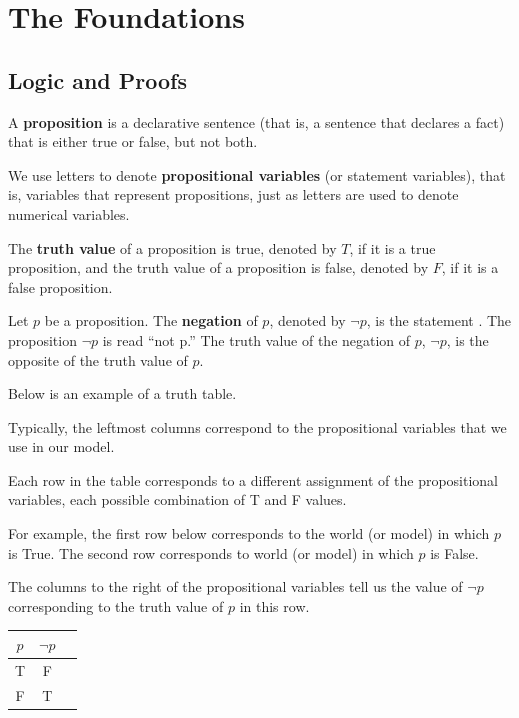 \section{The Foundations}
\subsection{Logic and Proofs}

\begin{defn}[proposition]
A \textbf{proposition} is a declarative sentence (that is, a sentence that declares a fact) that is either true
or false, but not both.
\end{defn}

\begin{defn}
We use letters to denote \textbf{propositional variables} (or statement variables), that is, variables that represent propositions, just as letters are used to denote numerical variables.
\end{defn}
\begin{defn} The \textbf{truth value} of a proposition is true, denoted by $T$, if it is a true proposition, and the truth value of a proposition
is false, denoted by $F$, if it is a false proposition.
\end{defn}

\begin{defn}[negation]
Let $p$ be a proposition. The \textbf{negation} of $p$, denoted by $ \lnot p$, is the statement 
\newline{}. 
\newline The proposition $\lnot p$ is read “not p.” The truth value of the negation of $p$, $\lnot p$, is the opposite of the truth value of $p$.
\end{defn}

\begin{exmp}
Below is an example of a truth table. 

Typically, the leftmost columns correspond to the propositional variables that we use in our model. 

Each row in the table corresponds to a different assignment of the propositional variables, each possible combination of T and F values.

For example, the first row below corresponds to the world (or model) in which $p$ is True. The second row corresponds to world (or model) in which $p$ is False. 

The columns to the right of the propositional variables tell us the value of $\lnot p$ corresponding to the truth value of $p$ in this row.

\begin{center}
\begin{tabular}{ | c | c | c |} 
  \hline
 $p$& $ \lnot p$ \\
 \hline
  T & F \\ 
  F & T \\ 
  \hline
\end{tabular}
\end{center}
\end{exmp}

